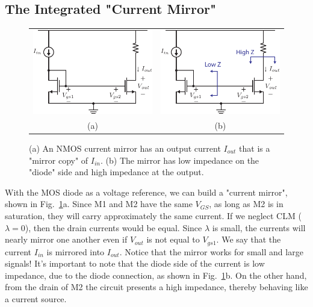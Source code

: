 \subsection{The Integrated "Current Mirror"}
\begin{figure}[tb]
\centering
\begin{tabular}{cc}
\includegraphics[scale=1]{5mirror_105.pdf} &
\includegraphics[scale=1]{5bmirror_105.pdf}\\
(a) & (b)\\
\end{tabular}
\caption{(a) An NMOS current mirror has an output current $I_{out}$ that is a "mirror copy" of $I_{in}$.  (b) The mirror has low impedance on the "diode" side and high impedance at the output.} \label{fig:5mirror_105.pdf}
\end{figure}
With the MOS diode as a voltage reference, we can build a "current mirror", shown in Fig.~\ref{fig:5mirror_105.pdf}a.  Since M1 and M2 have the same $V_{GS}$, as long as M2 is in saturation, they will carry approximately the same current.  If we neglect CLM ($\lambda = 0$), then the drain currents would be equal. Since $\lambda$ is small, the currents will nearly mirror one another even if $V_{out}$ is not equal to $V_{gs1}$. We say that the current $I_{in}$ is mirrored into $I_{out}$. Notice that the mirror works for small and large signals!
It's important to note that the diode side of the current is low impedance, due to the diode connection, as shown in Fig.~\ref{fig:5mirror_105.pdf}b.  On the other hand, from the drain of M2 the circuit presents a high impedance, thereby behaving like a current source.
